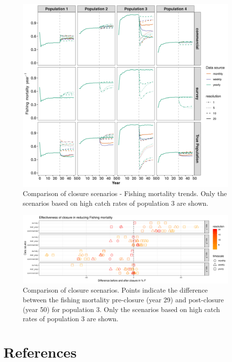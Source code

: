 \documentclass[review]{elsarticle}
\begin{document}
\begin{figure}[!ht]
	\includegraphics[width = \linewidth]{../analysis/F_trendsREV}
	\caption{Comparison of closure scenarios - Fishing mortality trends.
		Only the scenarios based on high catch rates of population 3
		are shown.}
	\label{fig:3}
\end{figure}

\begin{figure}[!ht]
	\includegraphics[width =\linewidth]{../analysis/Overview_plot_highPopRev}
	\caption{Comparison of closure scenarios. Points indicate the
		difference between the fishing mortality pre-closure (year 29)
		and post-closure (year 50) for population 3. Only the scenarios
		based on high catch rates of population 3 are shown.}
	\label{fig:4}
\end{figure}	

\clearpage

\section*{References}


\end{document}
